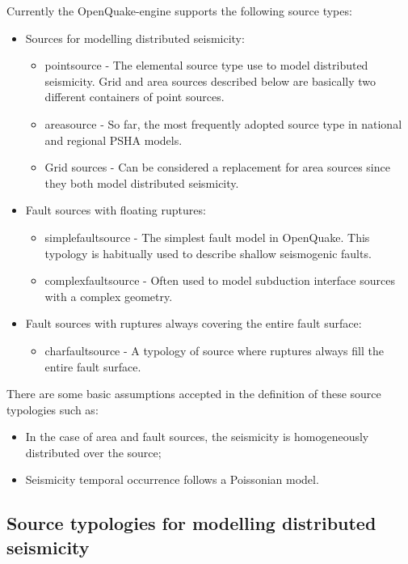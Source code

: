 Currently the OpenQuake-engine supports the following source types: 
\begin{itemize}
	\item Sources for modelling distributed seismicity:
	\begin{itemize}
		\item \Gls{pointsource} - The elemental source type use to model 
			distributed seismicity. Grid and area sources described below
			are basically two different containers of point sources.
		\item \Gls{areasource} - So far, the most frequently adopted source 
    		type in national and regional PSHA models.
		\item Grid sources - Can be considered a replacement 
    		for area sources since they both model distributed seismicity.
	\end{itemize}
	\item Fault sources with floating ruptures:
	\begin{itemize}
		\item \Gls{simplefaultsource} - The simplest fault model in OpenQuake. 
    		This typology is habitually used to describe shallow seismogenic 
    		faults.
		\item \Gls{complexfaultsource} - Often used to model subduction interface 
			sources with a complex geometry. 
	\end{itemize}
	\item Fault sources with ruptures always covering the entire fault surface:
	\begin{itemize}
		\item \Gls{charfaultsource} - A typology of source where ruptures
		always fill the entire fault surface.
	\end{itemize}
\end{itemize}
There are some basic assumptions accepted in the definition of these 
source typologies such as:
\begin{itemize}
	\item In the case of area and fault sources, the seismicity is 
        homogeneously distributed over the source; 	
	\item Seismicity temporal occurrence follows a Poissonian model. 
\end{itemize}
\subsection{Source typologies for modelling distributed seismicity}
